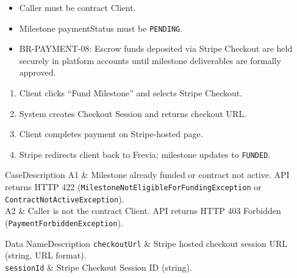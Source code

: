 \begin{itemize}[leftmargin=1.6em,topsep=3pt,itemsep=2pt,parsep=0pt,label=$\bullet$]
      \item Caller must be contract Client.
      \item Milestone paymentStatus must be \texttt{PENDING}.
\end{itemize}

\begin{itemize}[leftmargin=1.6em,topsep=3pt,itemsep=2pt,parsep=0pt,label=$\bullet$]\brrulelist
      \item BR-PAYMENT-08: Escrow funds deposited via Stripe Checkout are held securely in platform accounts until milestone deliverables are formally approved.
\end{itemize}

\begin{enumerate}[leftmargin=1.8em,topsep=3pt,itemsep=2pt,parsep=0pt]
      \item Client clicks ``Fund Milestone'' and selects Stripe Checkout.
      \item System creates Checkout Session and returns checkout URL.
      \item Client completes payment on Stripe-hosted page.
      \item Stripe redirects client back to Frevia; milestone updates to \texttt{FUNDED}.
\end{enumerate}

\begin{flowtable}{Case}{Description}
      A1 & Milestone already funded or contract not active. API returns HTTP 422 (\texttt{MilestoneNotEligibleForFundingException} or \texttt{ContractNotActiveException}).\\ \hline
      A2 & Caller is not the contract Client. API returns HTTP 403 Forbidden (\texttt{PaymentForbiddenException}).\\ \hline
\end{flowtable}

\begin{specdatatable}{Data Name}{Description}
      \texttt{checkoutUrl} & Stripe hosted checkout session URL (string, URL format).\\ \hline
      \texttt{sessionId} & Stripe Checkout Session ID (string).\\ \hline
\end{specdatatable}

